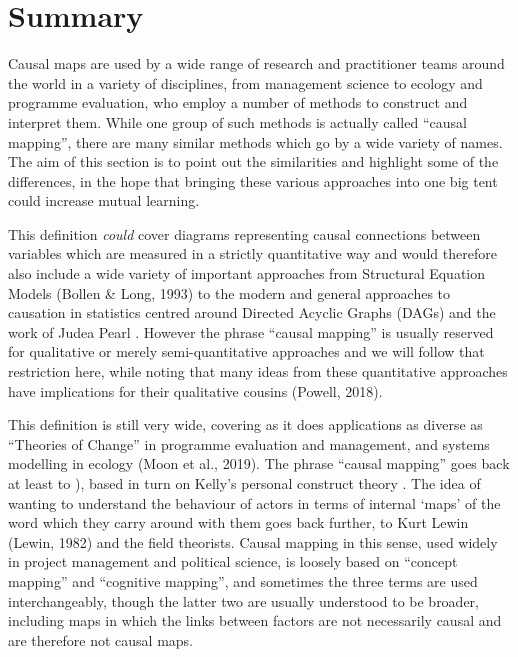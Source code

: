 \documentclass[
]{book}
\begin{document}
\hypertarget{summary-10}{%
\section{Summary}\label{summary-10}}

Causal maps are used by a wide range of research and practitioner teams around the world in a variety of disciplines, from management science to ecology and programme evaluation, who employ a number of methods to construct and interpret them. While one group of such methods is actually called ``causal mapping'', there are many similar methods which go by a wide variety of names. The aim of this section is to point out the similarities and highlight some of the differences, in the hope that bringing these various approaches into one big tent could increase mutual learning.

This definition \emph{could} cover diagrams representing causal connections between variables which are measured in a strictly quantitative way and would therefore also include a wide variety of important approaches from Structural Equation Models (Bollen \& Long, 1993) to the modern and general approaches to causation in statistics centred around Directed Acyclic Graphs (DAGs) and the work of Judea Pearl \citep{pearl2018}. However the phrase ``causal mapping'' is usually reserved for qualitative or merely semi-quantitative approaches and we will follow that restriction here, while noting that many ideas from these quantitative approaches have implications for their qualitative cousins (Powell, 2018).

This definition is still very wide, covering as it does applications as diverse as ``Theories of Change'' in programme evaluation and management, and systems modelling in ecology (Moon et al., 2019). The phrase ``causal mapping'' goes back at least to \citep{axelrod2015}), based in turn on Kelly's personal construct theory \citep{kellyPersonalConstructTheory1955}. The idea of wanting to understand the behaviour of actors in terms of internal `maps' of the word which they carry around with them goes back further, to Kurt Lewin (Lewin, 1982) and the field theorists. Causal mapping in this sense, used widely in project management and political science, is loosely based on ``concept mapping'' and ``cognitive mapping'', and sometimes the three terms are used interchangeably, though the latter two are usually understood to be broader, including maps in which the links between factors are not necessarily causal and are therefore not causal maps.
\end{document}
